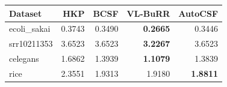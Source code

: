 \begin{tabular}{lrrrr}
Dataset & HKP & BCSF & VL-BuRR & AutoCSF \\
\hline
ecoli\_sakai & 0.3743 & 0.3490 & \textbf{0.2665} & 0.3446 \\
srr10211353 & 3.6523 & 3.6523 & \textbf{3.2267} & 3.6523 \\
celegans & 1.6862 & 1.3939 & \textbf{1.1079} & 1.3839 \\
rice & 2.3551 & 1.9313 & 1.9180 & \textbf{1.8811} \\
\end{tabular}
